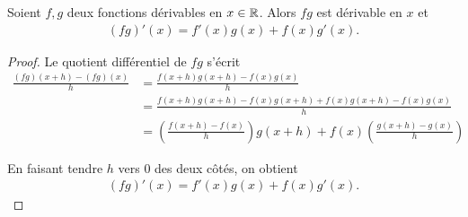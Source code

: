 \documentclass[main.tex]{subfiles}
\begin{document}
\begin{proposition}

    Soient $f, g$ deux fonctions dérivables en $x \in \mathbb{R}$.
    Alors $f g$ est dérivable en $x$ et
    \begin{align}
        (f g)'(x) = f'(x) g(x) + f(x) g'(x).
    \end{align}
\end{proposition}
\begin{proof}
    Le quotient différentiel de $f g$ s'écrit
    \begin{align}
        \frac {(f g)(x + h) - (f g)(x)} h
        &= \frac {f(x + h) g(x + h) - f(x) g(x)} h\\
        &= \frac {f(x + h) g(x + h) - f(x) g(x + h) + f(x) g(x + h) - f(x) g(x)} h\\
        &= \left(\frac {f(x + h) - f(x)} h\right) g(x + h) + f(x) \left(\frac {g(x + h) - g(x)} h\right)
    \end{align}

    En faisant tendre $h$ vers $0$ des deux côtés,
    on obtient
    \begin{align}
        (f g)'(x) = f'(x) g(x) + f(x) g'(x).
    \end{align}
\end{proof}
\end{document}
